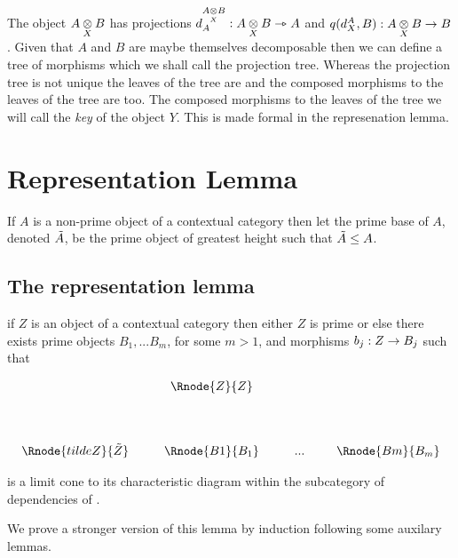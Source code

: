 \documentclass[10pt,a4paper]{scrartcl}
\begin{document}
\noindent The object $\crossx{A}{B}{X}$ has projections $\pc{\crossx{A}{B}{X}}{A}: \crossx{A}{B}{X} \smorph A$ and
$q(\pc{A}{X},B): \crossx{A}{B}{X} \morph B$. Given that  $A$ and $B$ are maybe themselves decomposable then we  can define a tree of morphisms which we shall call the projection tree. Whereas the projection tree is not unique the leaves of the tree are and the composed morphisms to the leaves of the tree are too. The composed morphisms to the leaves of the tree we
will call the \textit{key} of the object $Y$. This is made formal in the represenation lemma.

\section{Representation Lemma}
\begin{definition}
If $A$ is a non-prime object of a contextual category \ccat then let the prime base of $A$, denoted $\pbase{A}$,  be the 
prime object of \ccat greatest height such that $\pbase{A} \leq A$.
\end{definition}
\subsection{The representation lemma}

\begin{lemma}
if $Z$ is an object of a contextual category \ccat then either $Z$ is prime or else 
there exists prime objects $B_1,...B_m$, for some $m > 1$, and morphisms $b_j : Z \morph B_j$ such that

\begin{center}
\begin{displaymath}
\begin{array}{cp{0.3cm}c         p{0.3cm}  c p{0.2cm} c}
               & & \Rnode{Z}{Z} & &     & &  \\ [1.4cm]
\Rnode{tildeZ}{\pbase{Z}}& &\Rnode{B1}{B_1}& & ... & &\Rnode{Bm}{B_m}
\end{array}
\end{displaymath}
\end{center}
\noindent
is a limit cone to its characteristic diagram within the subcategory of dependencies of \ccat.
\end{lemma}
We prove a stronger version of this lemma by induction following some 
auxilary lemmas.
\end{document}
